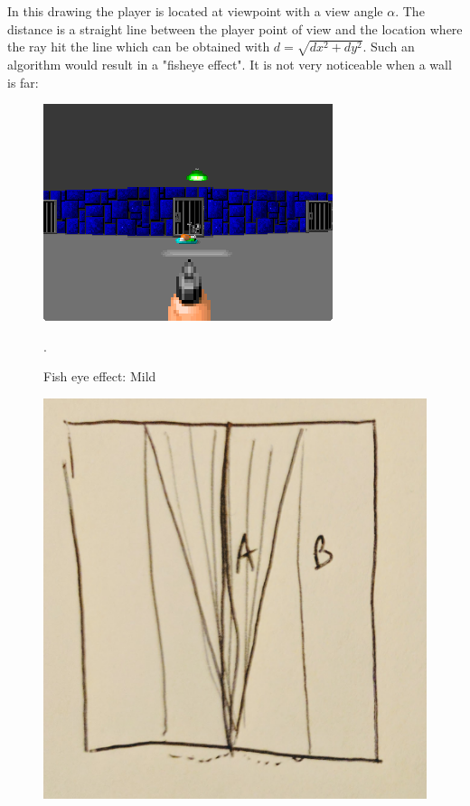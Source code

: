In this drawing the player is located at viewpoint with a view angle \begin{math}\alpha\end{math}. The distance  is a straight line between the player point of view and the location where the ray hit the line which can be obtained with $d = \sqrt{dx^2 + dy^2}$. Such an algorithm would result in a "fisheye effect". It is not very noticeable when a wall is far:

\begin{figure}[H]
\centering
 \includegraphics[width=\textwidth]{screenshots/fish_eye/bad_mild.png}
 \caption{Fish eye effect: Mild}. \label{fig:mips}
 \end{figure}

\begin{figure}[H]
  \centering
 \includegraphics[width=.3\textwidth]{imgs/drawings/fish_eye/fish_eye_top_far.png}
\end{figure}
\par


